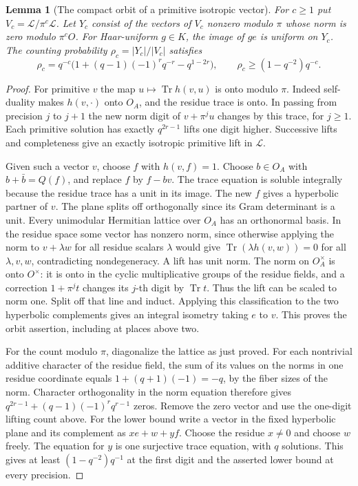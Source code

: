 \documentclass[a4paper,11pt]{article}
\newtheorem{lemma}[proposition]{Lemma}
\theoremstyle{definition}
\theoremstyle{remark}
\numberwithin{equation}{section}
\begin{document}
\begin{lemma}[The compact orbit of a primitive isotropic vector]
\leavevmode\label{lem:hermitianorbit900}
For \(c\ge1\) put \(V_c=\mathcal L/\pi^c\mathcal L\).
Let \(Y_c\) consist of the vectors of \(V_c\) nonzero modulo \(\pi\)
whose norm is zero modulo \(\pi^c O\).
For Haar-uniform \(g\in K\), the image of \(ge\) is uniform on
\(Y_c\). The counting probability \(\rho_c=|Y_c|/|V_c|\) satisfies
\[
 \rho_c=q^{-c}\big(1+(q-1)(-1)^r q^{-r}-q^{1-2r}\big),
                  \qquad \rho_c\ge (1-q^{-2})q^{-c}.
\]
\end{lemma}
\begin{proof}
For primitive \(v\) the map \(u\mapsto\operatorname{Tr}h(v,u)\)
is onto modulo \(\pi\). Indeed self-duality makes \(h(v,\cdot)\)
onto \(O_A\), and the residue trace is onto. In passing from
precision \(j\) to \(j+1\) the new norm digit of \(v+\pi^j u\)
changes by this trace, for \(j\ge1\). Each primitive solution has
exactly \(q^{2r-1}\) lifts one digit higher. Successive lifts and
completeness give an exactly isotropic primitive lift in \(\mathcal L\).

Given such a vector \(v\), choose \(f\) with \(h(v,f)=1\).
Choose \(b\in O_A\) with \(b+\bar b=Q(f)\), and replace \(f\) by
\(f-bv\). The trace equation is soluble integrally because
the residue trace has a unit in its image. The new \(f\) gives
a hyperbolic partner of \(v\). The plane splits off orthogonally
since its Gram determinant is a unit. Every unimodular Hermitian
lattice over \(O_A\) has an orthonormal basis. In the residue
space some vector has nonzero norm, since otherwise applying
the norm to \(v+\lambda w\) for all residue scalars \(\lambda\)
would give \(\operatorname{Tr}(\lambda h(v,w))=0\) for all
\(\lambda,v,w\), contradicting nondegeneracy. A lift has unit
norm. The norm on \(O_A^\times\) is onto \(O^\times\): it is
onto in the cyclic multiplicative groups of the residue fields,
and a correction \(1+\pi^j t\) changes its \(j\)-th digit by
\(\operatorname{Tr}t\). Thus the lift can be scaled to norm one.
Split off that line and induct. Applying this classification to
the two hyperbolic complements gives an integral isometry taking
\(e\) to \(v\). This proves the orbit assertion, including at
places above two.

For the count modulo \(\pi\), diagonalize the lattice as just
proved. For each nontrivial additive character of the residue
field, the sum of its values on the norms in one residue
coordinate equals \(1+(q+1)(-1)=-q\), by the fiber sizes of
the norm. Character orthogonality in the norm equation therefore
gives \(q^{2r-1}+(q-1)(-1)^r q^{r-1}\) zeros. Remove the zero
vector and use the one-digit lifting count above. For the lower
bound write a vector in the fixed hyperbolic plane and its
complement as \(x e+w+y f\). Choose the residue \(x\ne0\) and
choose \(w\) freely. The equation for \(y\) is one surjective
trace equation, with \(q\) solutions. This gives at least
\((1-q^{-2})q^{-1}\) at the first digit and the asserted lower
bound at every precision.
\end{proof}
\end{document}
